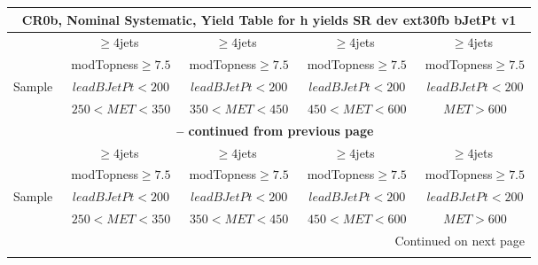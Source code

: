 \documentclass{article}
\begin{document}
\begin{longtable}{|l|c|c|c|c|} 
 
\multicolumn{5}{c}{ CR0b, Nominal Systematic, Yield Table for h yields SR dev ext30fb bJetPt v1 }\\* \hline 
  & $\ge4$jets  & $\ge4$jets  & $\ge4$jets  & $\ge4$jets \\* 
  & ~modTopness$\ge7.5$  & ~modTopness$\ge7.5$  & ~modTopness$\ge7.5$  & ~modTopness$\ge7.5$ \\* 
Sample  & ~$leadBJetPt<200$  & ~$leadBJetPt<200$  & ~$leadBJetPt<200$  & ~$leadBJetPt<200$ \\* 
  & ~$250<MET<350$  & ~$350<MET<450$  & ~$450<MET<600$  & ~$MET>600$ \\* 
\hline \hline 
\endfirsthead 
 
\multicolumn{5}{c}{{\bfseries \tablename\ \thetable{} -- continued from previous page}}\\* \hline 
  & $\ge4$jets  & $\ge4$jets  & $\ge4$jets  & $\ge4$jets \\* 
  & ~modTopness$\ge7.5$  & ~modTopness$\ge7.5$  & ~modTopness$\ge7.5$  & ~modTopness$\ge7.5$ \\* 
Sample  & ~$leadBJetPt<200$  & ~$leadBJetPt<200$  & ~$leadBJetPt<200$  & ~$leadBJetPt<200$ \\* 
  & ~$250<MET<350$  & ~$350<MET<450$  & ~$450<MET<600$  & ~$MET>600$ \\* 
\hline \hline 
\endhead 
 
\multicolumn{5}{|r|}{{Continued on next page}}\\* \hline 
\endfoot 
 
 
\endlastfoot 
 

\end{longtable}
\end{document}
